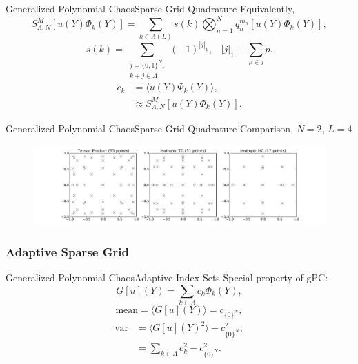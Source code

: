 \documentclass{beamer}
\begin{document}
\begin{frame}{Generalized Polynomial Chaos}{Sparse Grid Quadrature}%
  Equivalently,
\begin{equation*}
  S^{M}_{\Lambda,N}[u(Y)\Phi_k(Y)] = \sum_{k\in\Lambda(L)} s(k)\bigotimes_{n=1}^N
  q^{m_n}_n[u(Y)\Phi_k(Y)],
\end{equation*}
\begin{equation*}
  s(k) = \sum_{\substack{j=\{0,1\}^N,\\k+j\in\Lambda}} (-1)^{|j|_1},\hspace{10pt}|j|_1 \equiv \sum_{p\in j}p.
\end{equation*}
\begin{align*}
  c_k &= \langle u(Y)\Phi_k(Y) \rangle,\\
      &\approx S^{M}_{\Lambda,N}[u(Y)\Phi_k(Y)].
\end{align*}
\end{frame}

\begin{frame}{Generalized Polynomial Chaos}{Sparse Grid Quadrature}%
Comparison, $N=2$, $L=4$
    \begin{figure}[h!]
      \centering
       \hspace{-40pt}\includegraphics[width=1.15\textwidth]{../../graphics/sparse_plot}
    \end{figure}
\end{frame}

\subsubsection{Adaptive Sparse Grid}
\begin{frame}{Generalized Polynomial Chaos}{Adaptive Index Sets}%
Special property of gPC:
\begin{equation*}
  G[u](Y) = \sum_{k\in\Lambda}c_k\Phi_k(Y),
\end{equation*}
\begin{equation*}
  \text{mean}=\langle G[u](Y)\rangle = c_{\{0\}^N},
\end{equation*}
\begin{align*}
  \text{var} &=\langle G[u](Y)^2\rangle - c_{\{0\}^N}^2,\\
      &= \sum_{k\in\Lambda}c_k^2 - c_{\{0\}^N}^2.
\end{align*}
\end{frame}
\end{document}

